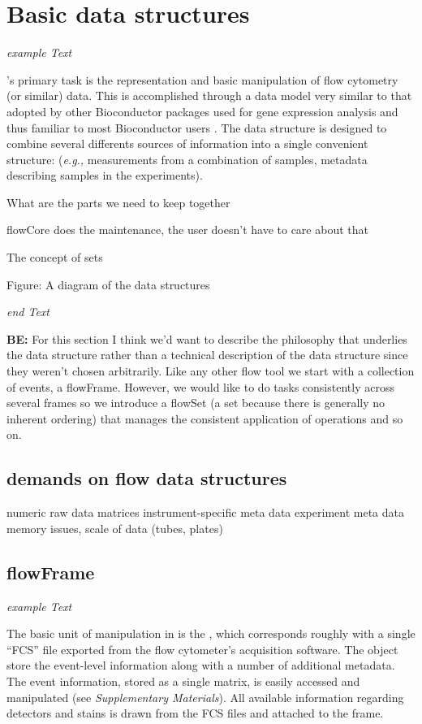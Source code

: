 \documentclass[12pt]{article}
\begin{document}
\section{Basic data structures}

\textit{example Text}

's primary task is the representation and basic
manipulation of flow cytometry (or similar) data. This is accomplished
through a data model very similar to that adopted by other
Bioconductor packages used for gene expression analysis and thus
familiar to most Bioconductor users \cite{}.  The data structure is
designed to combine several differents sources of information into a
single convenient structure: (\textit{e.g.,} measurements from a
combination of samples, metadata describing samples in the
experiments).

What are the parts we need to keep together

flowCore does the maintenance, the user doesn't have to care about
that

The concept of sets

Figure: A diagram of the data structures 

\textit{end Text}


{\bf BE:} For this section I think we'd want to describe the philosophy that
underlies the data structure rather than a technical description of
the data structure since they weren't chosen arbitrarily. Like any
other flow tool we start with a collection of events, a flowFrame.
However, we would like to do tasks consistently across several frames
so we introduce a flowSet (a set because there is generally no
inherent ordering) that manages the consistent application of
operations and so on.

\subsection{demands on flow data structures}


numeric raw data matrices
instrument-specific meta data
experiment meta data
memory issues, scale of data (tubes, plates)

\subsection{flowFrame}

\textit{example Text} 

The basic unit of manipulation in  is the
, which corresponds roughly with a single ``FCS''
file exported from the flow cytometer's acquisition software. The
 object store the event-level information along
with a number of additional metadata. The event information, stored as a
single matrix, is easily accessed and manipulated (see
\textit{Supplementary Materials}). All available information regarding
detectors and stains is drawn from the FCS files and attached to the frame.
\end{document}
